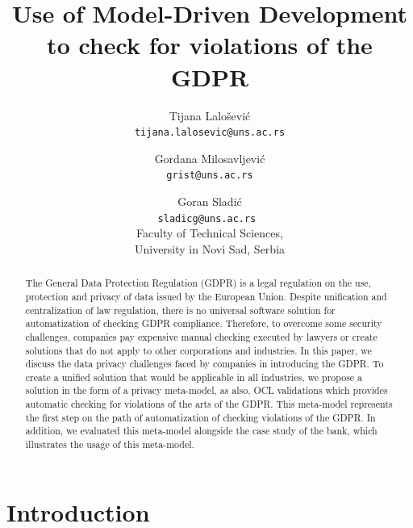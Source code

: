 \documentclass[11pt,english]{article}
\begin{document}
\title{Use of Model-Driven Development to check for violations of the GDPR}
\author{
  Tijana Lalošević\\
  \texttt{tijana.lalosevic@uns.ac.rs}
  \and
  Gordana Milosavljević\\
  \texttt{grist@uns.ac.rs}
  \and
  Goran Sladić\\
  \texttt{sladicg@uns.ac.rs }
  \\Faculty of Technical Sciences,\\ University in Novi Sad, Serbia
}


\date{}
\maketitle


\begin{abstract}
The General Data Protection Regulation (GDPR) is a legal regulation on the use, protection and privacy of data issued by the European Union. Despite unification and centralization of law regulation, there is no universal software solution for automatization of checking GDPR compliance. Therefore, to overcome some security challenges, companies pay expensive manual checking executed by lawyers or create solutions that do not apply to other corporations and industries. In this paper, we discuss the data privacy challenges faced by companies in introducing the GDPR. To create a unified solution that would be applicable in all industries, we propose a solution in the form of a privacy meta-model, as also, OCL validations which provides automatic checking for violations of the arts of the GDPR. This meta-model represents the first step on the path of automatization of checking violations of the GDPR. In addition, we evaluated this meta-model alongside the case study of the bank, which illustrates the usage of this meta-model.
\end{abstract}

\section{Introduction}
\end{document}
